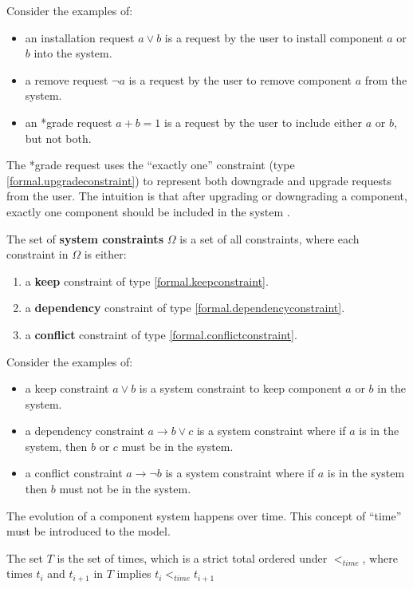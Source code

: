 Consider the examples of:
\begin{itemize}
  \item an installation request $a \vee b$ is a request by the user to install component $a$ or $b$ into the system.
  \item a remove request $\neg a$ is a request by the user to remove component $a$ from the system.
  \item an *grade request $a + b = 1$ is a request by the user to include either $a$ or $b$, but not both.
\end{itemize} 

The *grade request uses the ``exactly one'' constraint (type \ref{formal.upgradeconstraint}) to represent both downgrade and upgrade requests from the user.
The intuition is that after upgrading or downgrading a component, exactly one component should be included in the system \citep{treinen2009common}.

\begin{defs}
The set of \textbf{system constraints} $\Omega$ is a set of all constraints, where each constraint in $\Omega$ is either: 
\begin{enumerate}
  \item a \textbf{keep} constraint of type \ref{formal.keepconstraint}.
  \item a \textbf{dependency} constraint of type \ref{formal.dependencyconstraint}.
  \item a \textbf{conflict} constraint of type \ref{formal.conflictconstraint}.
\end{enumerate}
\end{defs}

Consider the examples of:
\begin{itemize}
  \item a keep constraint $a \vee b$ is a system constraint to keep component $a$ or $b$ in the system.
  \item a dependency constraint $a \rightarrow b \vee c$ is a system constraint where if $a$ is in the system, then $b$ or $c$ must be in the system.
  \item a conflict constraint $a \rightarrow \neg b$ is a system constraint where if $a$ is in the system then $b$ must not be in the system.
\end{itemize} 

The evolution of a component system happens over time.
This concept of ``time'' must be introduced to the model.
\begin{defs}
The set $T$ is the set of times, which is a strict total ordered under $<_{time}$, where times $t_i$ and $t_{i+1}$ in $T$ implies $t_i <_{time} t_{i+1}$
\end{defs}

